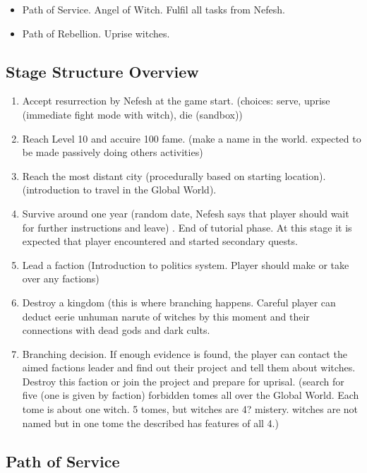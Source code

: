 \documentclass[a4paper,12pt]{article}
\begin{document}
\begin{itemize}
\item Path of Service. Angel of Witch. Fulfil all tasks from Nefesh.
\item Path of Rebellion. Uprise witches. 
\end{itemize}



\subsection{Stage Structure Overview}

\begin{enumerate}
\item Accept resurrection by Nefesh at the game start. (choices: serve, uprise (immediate fight mode with witch), die (sandbox))
\item Reach Level 10 and accuire 100 fame. (make a name in the world. expected to be made passively doing others activities)
\item Reach the most distant city (procedurally based on starting location). (introduction to travel in the Global World).
\item Survive around one year (random date, Nefesh says that player should wait for further instructions and leave) . End of tutorial phase. At this stage it is expected that player encountered and started secondary quests.
\item Lead a faction (Introduction to politics system. Player should make or take over any factions)
\item Destroy a kingdom (this is where branching happens. Careful player can deduct eerie unhuman narute of witches by this moment and their connections with dead gods and dark cults.
\item Branching decision. If enough evidence is found, the player can contact the aimed factions leader and find out their project and tell them about witches.
Destroy this faction or join the project and prepare for uprisal. (search for five (one is given by faction) forbidden tomes all over the Global World. Each tome is about one witch. 5 tomes, but witches are 4? mistery. witches are not named but in one tome the described has features of all 4.)
\end{enumerate}



\subsection{Path of Service}
\end{document}
